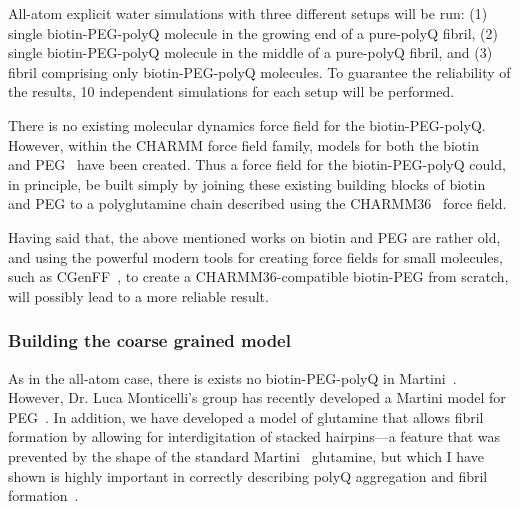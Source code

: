 \documentclass[a4paper,11pt,floatfix,authordate1-4,twocolumn]{revtex4-1}
\begin{document}

All-atom explicit water simulations
with three different setups will be run:
(1) single biotin-PEG-polyQ molecule in the growing end of a pure-polyQ fibril,
(2) single biotin-PEG-polyQ molecule in the middle of a pure-polyQ fibril, and
(3) fibril comprising only biotin-PEG-polyQ molecules.
To guarantee the reliability of the results,
10 independent simulations for each setup will be performed.

There is no existing molecular dynamics force field for the biotin-PEG-polyQ.
%
However, within the CHARMM force field family, models for both the biotin~\cite{Izrailev:1997a}
and PEG~\cite{Lee:2008b} have been created. Thus a force field for the biotin-PEG-polyQ
could, in principle, be built simply by joining these existing building blocks of
biotin and PEG to a polyglutamine chain described using the CHARMM36~\cite{Best:2012b}
force field.

Having said that, the above mentioned works on biotin and PEG are rather old, and using
the powerful modern tools for creating force fields for small molecules,
such as CGenFF~\cite{Vanommeslaeghe:2012a}, to create a CHARMM36-compatible
biotin-PEG from scratch, will possibly lead to a more reliable result.




\subsubsection*{Building the coarse grained model}
As in the all-atom case, there is exists no biotin-PEG-polyQ in Martini~\cite{Marrink:2007a}.
%
However, Dr. Luca Monticelli's group has recently developed a Martini model for PEG~\cite{Rossi:2012a}.
In addition, we have developed a model of glutamine that allows fibril formation
by allowing for interdigitation of stacked hairpins---a
feature that was prevented by the shape
of the standard Martini~\cite{Monticelli:2008a} glutamine,
but which I have shown is highly important in
correctly describing polyQ aggregation and
fibril formation~\cite{Miettinen:2014a}.
\end{document}
